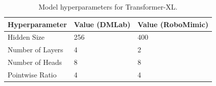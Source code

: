 \begin{table}[ht]
\caption{Model hyperparameters for Transformer-XL.}
\vspace{0.1in}
\centering
\begin{tabular}{@{}lll@{}}
\toprule
\textbf{Hyperparameter} & \textbf{Value (DMLab)} & \textbf{Value (RoboMimic)} \\ \midrule
Hidden Size             & 256                    & 400                        \\
Number of Layers        & 4                      & 2                          \\
Number of Heads         & 8                      & 8                          \\
Pointwise Ratio         & 4                      & 4                          \\ \bottomrule
\end{tabular}
\label{supp:table:xf_xl}
\end{table}